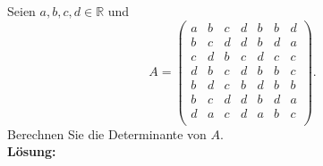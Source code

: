 \newpage
\subsubsection{}
Seien $a, b, c, d \in \mathbb{R}$ und
\[
A = \begin{pmatrix}
a & b & c & d & b & b & d \\
b & c & d & d & b & d & a \\
c & d & b & c & d & c & c \\
d & b & c & d & b & b & c \\
b & d & c & b & d & b & b \\
b & c & d & d & b & d & a \\
d & a & c & d & a & b & c \\
\end{pmatrix}.
\]
Berechnen Sie die Determinante von $A$. \\

\noindent \textbf{Lösung:}
